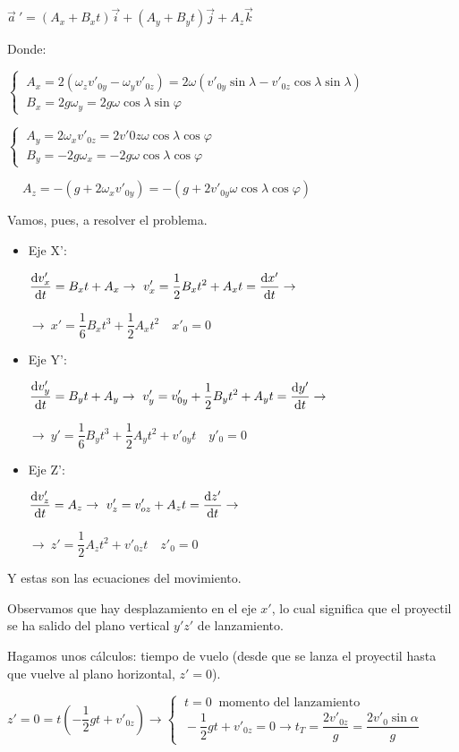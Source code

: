 $\vec a\ '=(A_x+B_xt)\vec i+(A_y+B_yt)\vec j+A_z\vec k$

Donde:



$\begin{cases}
\ A_x=2(\omega_z v'_{0y}-\omega_y v'_{0z})=2\omega(v'_{0y}\sin \lambda-v'_{0z} \cos \lambda \sin \lambda	 )\\
\ B_x=2g\omega_y=2g\omega \cos \lambda \sin \varphi
\end{cases}$


$\begin{cases}
\ A_y=2\omega_xv'_{0z}=2v'0z \omega \cos \lambda \cos \varphi\\
\ B_y=-2g\omega_x=-2g\omega \cos \lambda \cos \varphi
\end{cases}$

$\quad \ A_z=-(g+2\omega_x v'_{0y})=-(g+2v'_{0y}\omega \cos \lambda \cos \varphi)$


Vamos, pues, a resolver el problema.

\begin{itemize}
\item Eje X':

$\displaystyle \dv{v'_x}{t}=B_xt+A_x \to \ v'_x=\dfrac 1 2 B_x t^2 + A_x t =\dv{x'}{t} \to$

$\to  \ x'=\dfrac 1 6 B_x t^3+\dfrac 1 2 A_x t^2\quad x'_0=0$
\item Eje Y':

$\displaystyle \dv{v'_y}{t}=B_y t+A_y \to \ v'_y=v'_{0y}+\dfrac 1 2 B_y t^2 + A_y t =\dv{y'}{t} \to$

$\to  \ y'=\dfrac 1 6 B_y t^3+\dfrac 1 2 A_y t^2 +v'_{0y}t \quad y'_0=0$
\item Eje Z':

$\displaystyle \dv{v'_z}{t}=A_z \to \ v'_z=v'_{oz}+ A_z t =\dv{z'}{t} \to$

$\to  \ z'=\dfrac 1 2 A_z t^2 + v'_{0z}t \quad z'_0=0$

\end{itemize}

Y estas son las ecuaciones del movimiento.

Observamos que hay desplazamiento en el eje $x'$, lo cual significa que el proyectil se ha salido del plano vertical $y'z'$ de lanzamiento.

Hagamos unos cálculos: tiempo de vuelo (desde que se lanza el proyectil hasta que vuelve al plano horizontal, $z'=0$).

$z'=0 =t\left( -\dfrac 1 2 gt + v'_{0z} \right) \to \begin{cases}
 \ t=0  \ \text{ momento del lanzamiento}\\ \  -\dfrac 1 2 gt + v'_{0z} =0 \to t_T=\dfrac{2v'_{0z}}{g}=\dfrac{2v'_0\sin \alpha}{g}
 \end{cases}$

